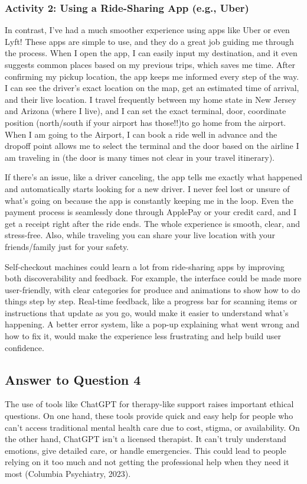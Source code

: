 \documentclass[
	letterpaper, %
]{jdf}
\begin{document}
\subsubsection {Activity 2: Using a Ride-Sharing App (e.g., Uber)}
In contrast, I’ve had a much smoother experience using apps like Uber or even Lyft! These apps are simple to use, and they do a great job guiding me through the process. When I open the app, I can easily input my destination, and it even suggests common places based on my previous trips, which saves me time. After confirming my pickup location, the app keeps me informed every step of the way. I can see the driver’s exact location on the map, get an estimated time of arrival, and their live location. I travel frequently between my home state in New Jersey and Arizona (where I live), and I can set the exact terminal, door, coordinate position (north/south if your airport has those!!)to go home from the airport. When I am going to the Airport, I can book a ride well in advance and the dropoff point allows me to select the terminal and the door based on the airline I am traveling in (the door is many times not clear in your travel itinerary).

If there’s an issue, like a driver canceling, the app tells me exactly what happened and automatically starts looking for a new driver. I never feel lost or unsure of what’s going on because the app is constantly keeping me in the loop. Even the payment process is seamlessly done through ApplePay or your credit card, and I get a receipt right after the ride ends. The whole experience is smooth, clear, and stress-free. Also, while traveling you can share your live location with your friends/family just for your safety. 

Self-checkout machines could learn a lot from ride-sharing apps by improving both discoverability and feedback. For example, the interface could be made more user-friendly, with clear categories for produce and animations to show how to do things step by step. Real-time feedback, like a progress bar for scanning items or instructions that update as you go, would make it easier to understand what’s happening. A better error system, like a pop-up explaining what went wrong and how to fix it, would make the experience less frustrating and help build user confidence.
\newpage

\subsection{Answer to Question 4}
The use of tools like ChatGPT for therapy-like support raises important ethical questions. On one hand, these tools provide quick and easy help for people who can’t access traditional mental health care due to cost, stigma, or availability. On the other hand, ChatGPT isn’t a licensed therapist. It can’t truly understand emotions, give detailed care, or handle emergencies. This could lead to people relying on it too much and not getting the professional help when they need it most (Columbia Psychiatry, 2023).
\end{document}
